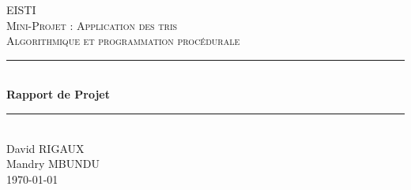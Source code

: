 \documentclass[12pt]{article}
\begin{document}
\lstset{language=Pascal} 
\begin{titlepage}

\newcommand{\HRule}{\rule{\linewidth}{0.5mm}} %

\center %
 

\textsc{\LARGE EISTI}\\[1.5cm] %
\textsc{\Large Mini-Projet : Application des tris}\\[0.5cm] %
\textsc{\large Algorithmique et programmation procédurale}\\[0.5cm] %


\HRule \\[0.4cm]
{ \huge \bfseries  Rapport de Projet}\\[0.4cm] %
\HRule \\[1cm]
 

\Large
David \textsc{RIGAUX}\\[0.5cm]
Mandry \textsc{MBUNDU}\\[1cm]


{\large \today}\\[1cm] %



\end{titlepage}
\end{document}
